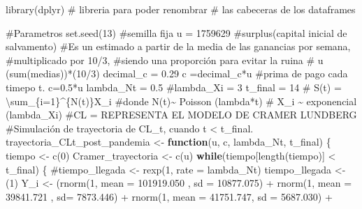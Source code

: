 \documentclass[
  us-letterpaper,
]{scrreprt}
\newenvironment{Shaded}{\begin{snugshade}}{\end{snugshade}}
\newcommand{\AttributeTok}[1]{\textcolor[rgb]{0.40,0.45,0.13}{#1}}
\newcommand{\CommentTok}[1]{\textcolor[rgb]{0.37,0.37,0.37}{#1}}
\newcommand{\ControlFlowTok}[1]{\textcolor[rgb]{0.00,0.23,0.31}{\textbf{#1}}}
\newcommand{\DecValTok}[1]{\textcolor[rgb]{0.68,0.00,0.00}{#1}}
\newcommand{\FloatTok}[1]{\textcolor[rgb]{0.68,0.00,0.00}{#1}}
\newcommand{\FunctionTok}[1]{\textcolor[rgb]{0.28,0.35,0.67}{#1}}
\newcommand{\NormalTok}[1]{\textcolor[rgb]{0.00,0.23,0.31}{#1}}
\newcommand{\OtherTok}[1]{\textcolor[rgb]{0.00,0.23,0.31}{#1}}
\newcommand{\SpecialCharTok}[1]{\textcolor[rgb]{0.37,0.37,0.37}{#1}}
\theoremstyle{definition}
\theoremstyle{plain}
\theoremstyle{plain}
\theoremstyle{remark}
\begin{document}
\begin{Shaded}
\begin{Highlighting}[]
\FunctionTok{library}\NormalTok{(dplyr) }\CommentTok{\# libreria para poder renombrar }
\CommentTok{\# las cabeceras de los dataframes}

\CommentTok{\#Parametros}
\FunctionTok{set.seed}\NormalTok{(}\DecValTok{13}\NormalTok{) }\CommentTok{\#semilla fija}
\NormalTok{u }\OtherTok{=} \DecValTok{1759629} \CommentTok{\#surplus(capital inicial de salvamento)}
\CommentTok{\#Es un estimado a partir de la media de las ganancias por semana, }
\CommentTok{\#multiplicado por 10/3, }
\CommentTok{\#siendo una proporción para evitar la ruina}
\CommentTok{\# u (sum(medias))*(10/3)}
\NormalTok{decimal\_c }\OtherTok{=} \FloatTok{0.29}
\NormalTok{c }\OtherTok{=}\NormalTok{decimal\_c}\SpecialCharTok{*}\NormalTok{u }\CommentTok{\#prima de pago cada timepo t. c=0.5*u}
\NormalTok{lambda\_Nt }\OtherTok{=} \FloatTok{0.5}
\CommentTok{\#lambda\_Xi = 3}
\NormalTok{t\_final }\OtherTok{=} \DecValTok{14}
\CommentTok{\# S(t) = \textbackslash{}sum\_\{i=1\}\^{}\{N(t)\}X\_i}
\CommentTok{\#donde N(t)\textasciitilde{} Poisson (lambda*t)}
\CommentTok{\# X\_i \textasciitilde{} exponencial (lambda\_Xi)}
\CommentTok{\#CL = REPRESENTA EL MODELO DE CRAMER LUNDBERG}
\CommentTok{\#Simulación de trayectoria de CL\_t, cuando t \textless{} t\_final.}
\NormalTok{trayectoria\_CLt\_post\_pandemia }\OtherTok{\textless{}{-}} \ControlFlowTok{function}\NormalTok{(u, c, lambda\_Nt, t\_final)}
\NormalTok{\{}
\NormalTok{  tiempo }\OtherTok{\textless{}{-}} \FunctionTok{c}\NormalTok{(}\DecValTok{0}\NormalTok{)}
\NormalTok{  Cramer\_trayectoria }\OtherTok{\textless{}{-}} \FunctionTok{c}\NormalTok{(u)}
  \ControlFlowTok{while}\NormalTok{(tiempo[}\FunctionTok{length}\NormalTok{(tiempo)] }\SpecialCharTok{\textless{}}\NormalTok{ t\_final)}
\NormalTok{  \{}
    \CommentTok{\#tiempo\_llegada \textless{}{-} rexp(1, rate = lambda\_Nt)}
\NormalTok{    tiempo\_llegada }\OtherTok{\textless{}{-}}\NormalTok{ (}\DecValTok{1}\NormalTok{)}
\NormalTok{    Y\_i }\OtherTok{\textless{}{-}}\NormalTok{  (}\FunctionTok{rnorm}\NormalTok{(}\DecValTok{1}\NormalTok{, }\AttributeTok{mean =} \FloatTok{101919.050}\NormalTok{ , }\AttributeTok{sd =} \FloatTok{10877.075}\NormalTok{) }\SpecialCharTok{+} 
              \FunctionTok{rnorm}\NormalTok{(}\DecValTok{1}\NormalTok{, }\AttributeTok{mean =}  \FloatTok{39841.721}\NormalTok{ , }\AttributeTok{sd=} \FloatTok{7873.446}\NormalTok{)  }\SpecialCharTok{+}  
              \FunctionTok{rnorm}\NormalTok{(}\DecValTok{1}\NormalTok{, }\AttributeTok{mean =}   \FloatTok{41751.747}\NormalTok{, }\AttributeTok{sd =} \FloatTok{5687.030}\NormalTok{) }\SpecialCharTok{+} 

\end{Highlighting}
\end{Shaded}
\end{document}
